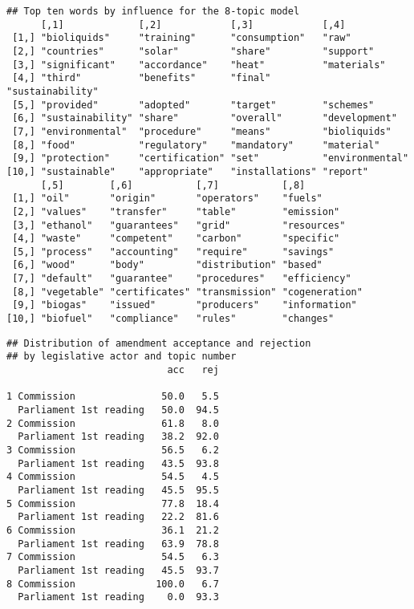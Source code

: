 \documentclass[11pt]{article}
\begin{document}
\begin{verbatim}
## Top ten words by influence for the 8-topic model
      [,1]             [,2]            [,3]            [,4]            
 [1,] "bioliquids"     "training"      "consumption"   "raw"           
 [2,] "countries"      "solar"         "share"         "support"       
 [3,] "significant"    "accordance"    "heat"          "materials"     
 [4,] "third"          "benefits"      "final"         "sustainability"
 [5,] "provided"       "adopted"       "target"        "schemes"       
 [6,] "sustainability" "share"         "overall"       "development"   
 [7,] "environmental"  "procedure"     "means"         "bioliquids"    
 [8,] "food"           "regulatory"    "mandatory"     "material"      
 [9,] "protection"     "certification" "set"           "environmental" 
[10,] "sustainable"    "appropriate"   "installations" "report"        
      [,5]        [,6]           [,7]           [,8]          
 [1,] "oil"       "origin"       "operators"    "fuels"       
 [2,] "values"    "transfer"     "table"        "emission"    
 [3,] "ethanol"   "guarantees"   "grid"         "resources"   
 [4,] "waste"     "competent"    "carbon"       "specific"    
 [5,] "process"   "accounting"   "require"      "savings"     
 [6,] "wood"      "body"         "distribution" "based"       
 [7,] "default"   "guarantee"    "procedures"   "efficiency"  
 [8,] "vegetable" "certificates" "transmission" "cogeneration"
 [9,] "biogas"    "issued"       "producers"    "information" 
[10,] "biofuel"   "compliance"   "rules"        "changes"
\end{verbatim}

\newpage
\begin{verbatim}
## Distribution of amendment acceptance and rejection
## by legislative actor and topic number
                            acc   rej
                                     
1 Commission               50.0   5.5
  Parliament 1st reading   50.0  94.5
2 Commission               61.8   8.0
  Parliament 1st reading   38.2  92.0
3 Commission               56.5   6.2
  Parliament 1st reading   43.5  93.8
4 Commission               54.5   4.5
  Parliament 1st reading   45.5  95.5
5 Commission               77.8  18.4
  Parliament 1st reading   22.2  81.6
6 Commission               36.1  21.2
  Parliament 1st reading   63.9  78.8
7 Commission               54.5   6.3
  Parliament 1st reading   45.5  93.7
8 Commission              100.0   6.7
  Parliament 1st reading    0.0  93.3
\end{verbatim}
\end{document}
